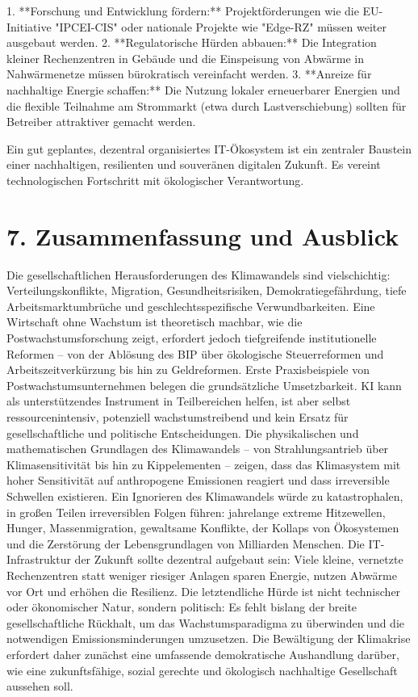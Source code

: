\documentclass[12pt, a4paper]{article}
\begin{document}
	1. **Forschung und Entwicklung fördern:** Projektförderungen wie die EU-Initiative "IPCEI-CIS"
	oder nationale Projekte wie "Edge-RZ" müssen weiter ausgebaut werden.
	2. **Regulatorische Hürden abbauen:** Die Integration kleiner Rechenzentren in Gebäude und
	die Einspeisung von Abwärme in Nahwärmenetze müssen bürokratisch vereinfacht werden.
	3. **Anreize für nachhaltige Energie schaffen:** Die Nutzung lokaler erneuerbarer Energien
	und die flexible Teilnahme am Strommarkt (etwa durch Lastverschiebung) sollten für
	Betreiber attraktiver gemacht werden.
	
	Ein gut geplantes, dezentral organisiertes IT-Ökosystem ist ein zentraler Baustein einer
	nachhaltigen, resilienten und souveränen digitalen Zukunft. Es vereint technologischen
	Fortschritt mit ökologischer Verantwortung.
	
	\section*{7. Zusammenfassung und Ausblick}
	
	Die gesellschaftlichen Herausforderungen des Klimawandels sind vielschichtig:
	Verteilungskonflikte, Migration, Gesundheitsrisiken, Demokratiegefährdung, tiefe
	Arbeitsmarktumbrüche und geschlechtsspezifische Verwundbarkeiten. Eine Wirtschaft ohne
	Wachstum ist theoretisch machbar, wie die Postwachstumsforschung zeigt, erfordert
	jedoch tiefgreifende institutionelle Reformen – von der Ablösung des BIP über
	ökologische Steuerreformen und Arbeitszeitverkürzung bis hin zu Geldreformen.
	Erste Praxisbeispiele von Postwachstumsunternehmen belegen die grundsätzliche
	Umsetzbarkeit. KI kann als unterstützendes Instrument in Teilbereichen helfen, ist
	aber selbst ressourcenintensiv, potenziell wachstumstreibend und kein Ersatz für
	gesellschaftliche und politische Entscheidungen. Die physikalischen und mathematischen
	Grundlagen des Klimawandels – von Strahlungsantrieb über Klimasensitivität bis hin zu
	Kippelementen – zeigen, dass das Klimasystem mit hoher Sensitivität auf anthropogene
	Emissionen reagiert und dass irreversible Schwellen existieren. Ein Ignorieren des
	Klimawandels würde zu katastrophalen, in großen Teilen irreversiblen Folgen führen:
	jahrelange extreme Hitzewellen, Hunger, Massenmigration, gewaltsame Konflikte, der
	Kollaps von Ökosystemen und die Zerstörung der Lebensgrundlagen von Milliarden Menschen.
	Die IT-Infrastruktur der Zukunft sollte dezentral aufgebaut sein: Viele kleine, vernetzte
	Rechenzentren statt weniger riesiger Anlagen sparen Energie, nutzen Abwärme vor Ort und
	erhöhen die Resilienz. Die letztendliche Hürde ist nicht technischer oder ökonomischer
	Natur, sondern politisch: Es fehlt bislang der breite gesellschaftliche Rückhalt, um das
	Wachstumsparadigma zu überwinden und die notwendigen Emissionsminderungen umzusetzen.
	Die Bewältigung der Klimakrise erfordert daher zunächst eine umfassende demokratische
	Aushandlung darüber, wie eine zukunftsfähige, sozial gerechte und ökologisch nachhaltige
	Gesellschaft aussehen soll.
	
\end{document}
